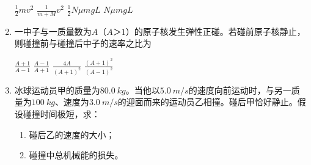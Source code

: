 \begin{enumerate}[leftmargin=0em]
\fourchoices
{$ \frac { 1 } { 2 } m v ^ { 2 } $}
{$ \frac { 1 } { m + M } v ^ { 2 } $}
{$ \frac { 1 } { 2 } N \mu m g L $}
{$ N \mu m g L $}


\item
{}
一中子与一质量数为$ A $（$ A $＞$ 1 $）的原子核发生弹性正碰。若碰前原子核静止，则碰撞前与碰撞后中子的速率之比为  

\fourchoices
{$ \frac { A + 1 } { A - 1 } $}
{$ \frac { A - 1 } { A + 1 } $}
{$ \frac { 4 A } { ( A + 1 ) ^ { 2 } } $}
{$ \frac { ( A + 1 ) ^ { 2 } } { ( A - 1 ) ^ { 2 } } $}



\item 
{}
冰球运动员甲的质量为$ 80.0 \ kg $。当他以$ 5.0 \ m/s $的速度向前运动时，与另一质量为$ 100 \ kg $、速度为$ 3.0 \ m/s $的迎面而来的运动员乙相撞。碰后甲恰好静止。假设碰撞时间极短，求：
\begin{enumerate}
\renewcommand{\labelenumi}{\arabic{enumi}.}
\item
碰后乙的速度的大小；
\item 
碰撞中总机械能的损失。

\end{enumerate}








\end{enumerate}
